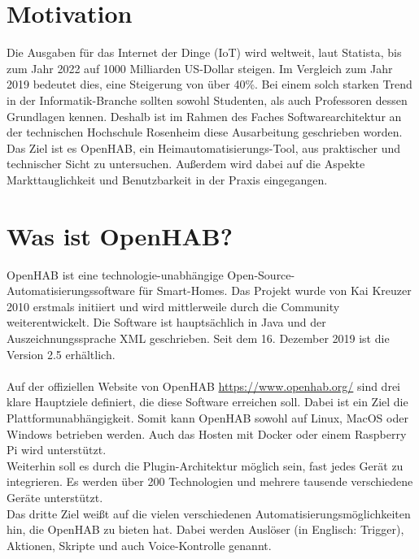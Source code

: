 \section{Motivation}
{Die Ausgaben für das Internet der Dinge (IoT) wird weltweit, laut Statista, bis zum Jahr 2022 auf 1000 Milliarden US-Dollar steigen. Im Vergleich zum Jahr 2019 bedeutet dies, eine Steigerung von über 40\%.}\cite{STATISTA01:IOT} Bei einem solch starken Trend in der Informatik-Branche sollten sowohl Studenten, als auch Professoren dessen Grundlagen kennen.
Deshalb ist im Rahmen des Faches Softwarearchitektur an der technischen Hochschule Rosenheim diese Ausarbeitung geschrieben worden. Das Ziel ist es OpenHAB, ein Heimautomatisierungs-Tool, aus praktischer und technischer Sicht zu untersuchen. Außerdem wird dabei auf die Aspekte Markttauglichkeit und Benutzbarkeit in der Praxis eingegangen.

\section{Was ist OpenHAB?}
\label{s:what-is-openhab}
OpenHAB ist eine technologie-unabhängige Open-Source-Automatisierungssoftware für Smart-Homes.
Das Projekt wurde von Kai Kreuzer 2010 erstmals initiiert und wird mittlerweile durch die Community weiterentwickelt. Die Software ist hauptsächlich in Java und der Auszeichnungssprache XML geschrieben. Seit dem 16. Dezember 2019 ist die Version 2.5 erhältlich.\\
\\
Auf der offiziellen Website von OpenHAB \url{https://www.openhab.org/} sind drei klare Hauptziele definiert, die diese Software erreichen soll. Dabei ist ein Ziel die Plattformunabhängigkeit. Somit kann OpenHAB sowohl auf Linux, MacOS oder Windows betrieben werden. Auch das Hosten mit Docker oder einem Raspberry Pi wird unterstützt.\\
Weiterhin soll es durch die Plugin-Architektur möglich sein, fast jedes Gerät zu integrieren.
Es werden über 200 Technologien und mehrere tausende verschiedene Geräte unterstützt.\\
Das dritte Ziel weißt auf die vielen verschiedenen Automatisierungsmöglichkeiten hin, die OpenHAB zu bieten hat. Dabei werden Auslöser (in Englisch: Trigger), Aktionen, Skripte und auch Voice-Kontrolle genannt.

